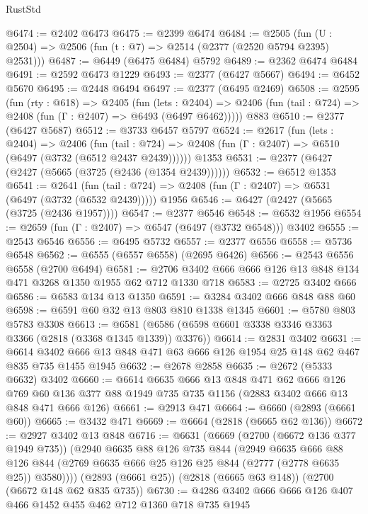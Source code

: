 \begin{lexlean}{RustStd}
\begin{coremodule}
@6474 := @2402 @6473
@6475 := @2399 @6474
@6484 := @2505 (fun (U : @2504) => @2506 (fun (t : @7) => @2514 (@2377 (@2520 @5794 @2395) @2531)))
@6487 := @6449 (@6475 @6484) @5792
@6489 := @2362 @6474 @6484
@6491 := @2592 @6473 @1229
@6493 := @2377 (@6427 @5667)
@6494 := @6452 @5670
@6495 := @2448 @6494
@6497 := @2377 (@6495 @2469)
@6508 := @2595
    (fun (rty : @618) =>
    @2405
      (fun (lets : @2404) =>
      @2406 (fun (tail : @724) => @2408 (fun (Γ : @2407) => @6493 (@6497 @6462)))))
    @883
@6510 := @2377 (@6427 @5687)
@6512 := @3733 @6457 @5797
@6524 := @2617
    (fun (lets : @2404) =>
    @2406
      (fun (tail : @724) => @2408 (fun (Γ : @2407) => @6510 (@6497 (@3732 (@6512 @2437 @2439))))))
    @1353
@6531 := @2377 (@6427 (@2427 (@5665 (@3725 (@2436 (@1354 @2439))))))
@6532 := @6512 @1353
@6541 := @2641
    (fun (tail : @724) => @2408 (fun (Γ : @2407) => @6531 (@6497 (@3732 (@6532 @2439)))))
    @1956
@6546 := @6427 (@2427 (@5665 (@3725 (@2436 @1957))))
@6547 := @2377 @6546
@6548 := @6532 @1956
@6554 := @2659 (fun (Γ : @2407) => @6547 (@6497 (@3732 @6548))) @3402
@6555 := @2543 @6546
@6556 := @6495 @5732
@6557 := @2377 @6556
@6558 := @5736 @6548
@6562 := @6555 (@6557 @6558) (@2695 @6426)
@6566 := @2543 @6556 @6558 (@2700 @6494)
@6581 := @2706 @3402 @666 @666 @126 @13 @848 @134 @471 @3268 @1350 @1955 @62 @712 @1330 @718
@6583 := @2725 @3402 @666
@6586 := @6583 @134 @13 @1350
@6591 := @3284 @3402 @666 @848 @88 @60
@6598 := @6591 @60 @32 @13 @803 @810 @1338 @1345
@6601 := @5780 @803 @5783 @3308
@6613 := @6581 (@6586 (@6598 @6601 @3338 @3346 @3363 @3366 (@2818 (@3368 @1345 @1339)) @3376))
@6614 := @2831 @3402
@6631 := @6614 @3402 @666 @13 @848 @471 @63 @666 @126 @1954 @25 @148 @62 @467 @835 @735 @1455 @1945
@6632 := @2678 @2858
@6635 := @2672 (@5333 @6632) @3402
@6660 := @6614
    @6635
    @666
    @13
    @848
    @471
    @62
    @666
    @126
    @769
    @60
    @136
    @377
    @88
    @1949
    @735
    @735
    @1156
    (@2883 @3402 @666 @13 @848 @471 @666 @126)
@6661 := @2913 @471
@6664 := @6660 (@2893 (@6661 @60))
@6665 := @3432 @471
@6669 := @6664 (@2818 (@6665 @62 @136))
@6672 := @2927 @3402 @13 @848
@6716 := @6631
    (@6669
      (@2700 (@6672 @136 @377 @1949 @735))
      (@2940
        @6635
        @88
        @126
        @735
        @844
        (@2949
          @6635
          @666
          @88
          @126
          @844
          (@2769 @6635 @666 @25 @126 @25 @844 (@2777 (@2778 @6635 @25)) @3580))))
    (@2893 (@6661 @25))
    (@2818 (@6665 @63 @148))
    (@2700 (@6672 @148 @62 @835 @735))
@6730 := @4286 @3402 @666 @666 @126 @407 @466 @1452 @455 @462 @712 @1360 @718 @735 @1945

\end{coremodule}
\end{lexlean}
